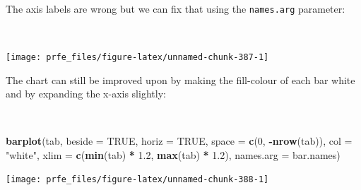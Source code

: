 \documentclass[12pt,a4paper]{book}
\newenvironment{Shaded}{\begin{snugshade}}{\end{snugshade}}
\newcommand{\KeywordTok}[1]{\textcolor[rgb]{0.13,0.29,0.53}{\textbf{#1}}}
\newcommand{\DataTypeTok}[1]{\textcolor[rgb]{0.13,0.29,0.53}{#1}}
\newcommand{\DecValTok}[1]{\textcolor[rgb]{0.00,0.00,0.81}{#1}}
\newcommand{\FloatTok}[1]{\textcolor[rgb]{0.00,0.00,0.81}{#1}}
\newcommand{\StringTok}[1]{\textcolor[rgb]{0.31,0.60,0.02}{#1}}
\newcommand{\OtherTok}[1]{\textcolor[rgb]{0.56,0.35,0.01}{#1}}
\newcommand{\OperatorTok}[1]{\textcolor[rgb]{0.81,0.36,0.00}{\textbf{#1}}}
\newcommand{\NormalTok}[1]{#1}
\theoremstyle{definition}
\theoremstyle{definition}
\theoremstyle{definition}
\theoremstyle{remark}
\begin{document}
~

The axis labels are wrong but we can fix that using the
\texttt{names.arg} parameter:

~

\begin{Shaded}
\end{Shaded}

\begin{center}\texttt{[image: prfe\_files/figure-latex/unnamed-chunk-387-1]} \end{center}

\newpage

The chart can still be improved upon by making the fill-colour of each
bar white and by expanding the x-axis slightly:

~

\begin{Shaded}
\begin{Highlighting}[]
\KeywordTok{barplot}\NormalTok{(tab, }\DataTypeTok{beside =} \OtherTok{TRUE}\NormalTok{, }\DataTypeTok{horiz =} \OtherTok{TRUE}\NormalTok{, }\DataTypeTok{space =} \KeywordTok{c}\NormalTok{(}\DecValTok{0}\NormalTok{, }\OperatorTok{-}\KeywordTok{nrow}\NormalTok{(tab)),}
        \DataTypeTok{col =} \StringTok{"white"}\NormalTok{, }\DataTypeTok{xlim =} \KeywordTok{c}\NormalTok{(}\KeywordTok{min}\NormalTok{(tab) }\OperatorTok{*}\StringTok{ }\FloatTok{1.2}\NormalTok{, }\KeywordTok{max}\NormalTok{(tab) }\OperatorTok{*}\StringTok{ }\FloatTok{1.2}\NormalTok{),}
        \DataTypeTok{names.arg =}\NormalTok{ bar.names)}
\end{Highlighting}
\end{Shaded}

\begin{center}\texttt{[image: prfe\_files/figure-latex/unnamed-chunk-388-1]} \end{center}

~
\end{document}
